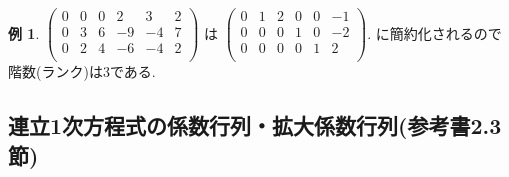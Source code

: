 \documentclass[dvipdfmx,a4paper,11pt]{article}
\theoremstyle{definition}
\newtheorem{exa}[thm]{例}
\begin{document}
\begin{exa}
$
 \begin{pmatrix}
 0& 0& 0  &2 & 3 & 2\\
 0& 3& 6  &-9 & -4 & 7\\
 0& 2& 4  &-6 & -4 & 2\\
 \end{pmatrix}
 $
は
 $
  \begin{pmatrix}
 0& 1& 2  &0 & 0 & -1\\
 0& 0& 0  &1 & 0 &-2\\
 0& 0& 0 &0 & 1 & 2\\
 \end{pmatrix}.
 $
 に簡約化されるので階数(ランク)は3である.
\end{exa}

\subsection{連立1次方程式の係数行列・拡大係数行列(参考書2.3節)}
\end{document}
